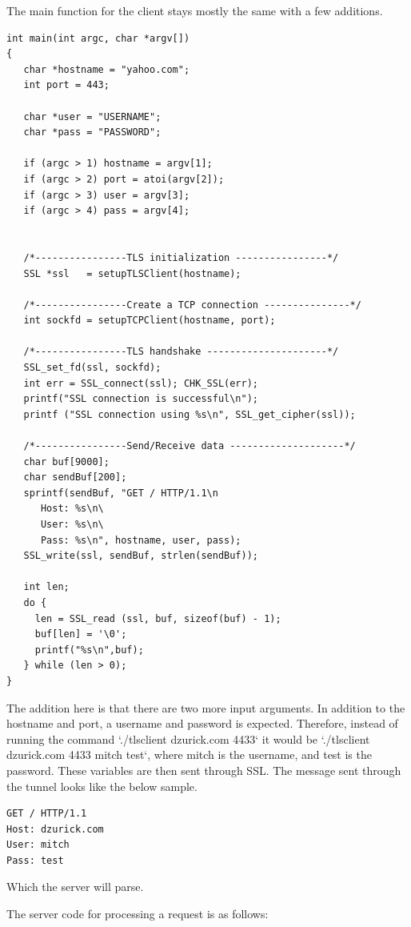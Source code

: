 \documentclass[12pt]{article}
\begin{document}
The main function for the client stays mostly the same with a few additions.

\begin{verbatim}
int main(int argc, char *argv[])
{
   char *hostname = "yahoo.com";
   int port = 443;

   char *user = "USERNAME";
   char *pass = "PASSWORD";

   if (argc > 1) hostname = argv[1];
   if (argc > 2) port = atoi(argv[2]);
   if (argc > 3) user = argv[3];
   if (argc > 4) pass = argv[4];


   /*----------------TLS initialization ----------------*/
   SSL *ssl   = setupTLSClient(hostname);

   /*----------------Create a TCP connection ---------------*/
   int sockfd = setupTCPClient(hostname, port);

   /*----------------TLS handshake ---------------------*/
   SSL_set_fd(ssl, sockfd);
   int err = SSL_connect(ssl); CHK_SSL(err);
   printf("SSL connection is successful\n");
   printf ("SSL connection using %s\n", SSL_get_cipher(ssl));

   /*----------------Send/Receive data --------------------*/
   char buf[9000];
   char sendBuf[200];
   sprintf(sendBuf, "GET / HTTP/1.1\n
      Host: %s\n\
      User: %s\n\
      Pass: %s\n", hostname, user, pass);
   SSL_write(ssl, sendBuf, strlen(sendBuf));

   int len;
   do {
     len = SSL_read (ssl, buf, sizeof(buf) - 1);
     buf[len] = '\0';
     printf("%s\n",buf);
   } while (len > 0);
}
\end{verbatim}

The addition here is that there are two more input arguments. In addition to the hostname and port, a username and password is expected. Therefore, instead of running the command `./tlsclient dzurick.com 4433` it would be `./tlsclient dzurick.com 4433 mitch test`, where mitch is the username, and test is the password. These variables are then sent through SSL. The message sent through the tunnel looks like the below sample.

\begin{verbatim}
GET / HTTP/1.1
Host: dzurick.com
User: mitch
Pass: test
\end{verbatim}

Which the server will parse.

The server code for processing a request is as follows:
\end{document}
